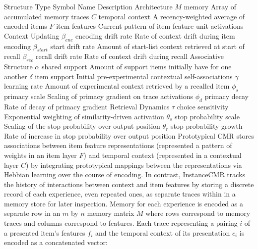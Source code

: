 {}%
{{Structure Type}%
{Symbol}%
{Name}%
{Description}%
}%
{{Architecture}%
{}%
{}%
{}%
}%
{{}%
{$M$}%
{memory}%
{Array of accumulated memory traces}%
}%
{{}%
{$C$}%
{temporal context}%
{A recency-weighted average of encoded items}%
}%
{{}%
{$F$}%
{item features}%
{Current pattern of item feature unit activations}%
}%
{{Context Updating}%
{}%
{}%
{}%
}%
{{}%
{${\beta}_{enc}$}%
{encoding drift rate}%
{Rate of context drift during item encoding}%
}%
{{}%
{${\beta}_{start}$}%
{start drift rate}%
{Amount of start-list context retrieved at start of recall}%
}%
{{}%
{${\beta}_{rec}$}%
{recall drift rate}%
{Rate of context drift during recall}%
}%
{{Associative Structure}%
{}%
{}%
{}%
}%
{{}%
{${\alpha}$}%
{shared support}%
{Amount of support items initially have for one another}%
}%
{{}%
{${\delta}$}%
{item support}%
{Initial pre-experimental contextual self-associations}%
}%
{{}%
{${\gamma}$}%
{learning rate}%
{Amount of experimental context retrieved by a recalled item}%
}%
{{}%
{${\phi}_{s}$}%
{primacy scale}%
{Scaling of primacy gradient on trace activations}%
}%
{{}%
{${\phi}_{d}$}%
{primacy decay}%
{Rate of decay of primacy gradient}%
}%
{{Retrieval Dynamics}%
{}%
{}%
{}%
}%
{{}%
{${\tau}$}%
{choice sensitivity}%
{Exponential weighting of similarity-driven activation}%
}%
{{}%
{${\theta}_{s}$}%
{stop probability scale}%
{Scaling of the stop probability over output position}%
}%
{{}%
{${\theta}_{r}$}%
{stop probability growth}%
{Rate of increase in stop probability over output position}%
}%
\markdownRendererInterblockSeparator
{}\markdownRendererInterblockSeparator
{}Prototypical CMR stores associations between item feature representations (represented a pattern of weights in an item layer $F$) and temporal context (represented in a contextual layer $C$) by integrating prototypical mappings between the representations via Hebbian learning over the course of encoding. In contrast, InstanceCMR tracks the history of interactions between context and item features by storing a discrete record of each experience, even repeated ones, as separate traces within in a memory store for later inspection. Memory for each experience is encoded as a separate row in an $m$ by $n$ memory matrix $M$ where rows correspond to memory traces and columns correspond to features. Each trace representing a pairing $i$ of a presented item’s features $f_i$ and the temporal context of its presentation $c_i$ is encoded as a concatenated vector:\markdownRendererInterblockSeparator
